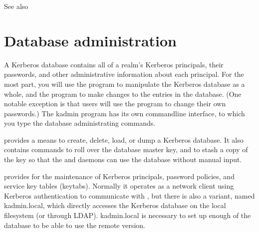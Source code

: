 \documentclass[letterpaper,10pt,english]{sphinxmanual}
\begin{document}
\sphinxAtStartPar
See also {\hyperref[\detokenize{admin/database:incr-db-prop}]{}}


\chapter{Database administration}
\label{\detokenize{admin/database:database-administration}}\label{\detokenize{admin/database::doc}}
\sphinxAtStartPar
A Kerberos database contains all of a realm’s Kerberos principals,
their passwords, and other administrative information about each
principal.  For the most part, you will use the {\hyperref[\detokenize{admin/admin_commands/kdb5_util:kdb5-util-8}]{}}
program to manipulate the Kerberos database as a whole, and the
{\hyperref[\detokenize{admin/admin_commands/kadmin_local:kadmin-1}]{}} program to make changes to the entries in the
database.  (One notable exception is that users will use the
 program to change their own passwords.)  The kadmin
program has its own command\sphinxhyphen{}line interface, to which you type the
database administrating commands.

\sphinxAtStartPar
{\hyperref[\detokenize{admin/admin_commands/kdb5_util:kdb5-util-8}]{}} provides a means to create, delete, load, or dump
a Kerberos database.  It also contains commands to roll over the
database master key, and to stash a copy of the key so that the
{\hyperref[\detokenize{admin/admin_commands/kadmind:kadmind-8}]{}} and {\hyperref[\detokenize{admin/admin_commands/krb5kdc:krb5kdc-8}]{}} daemons can use the database
without manual input.

\sphinxAtStartPar
{\hyperref[\detokenize{admin/admin_commands/kadmin_local:kadmin-1}]{}} provides for the maintenance of Kerberos principals,
password policies, and service key tables (keytabs).  Normally it
operates as a network client using Kerberos authentication to
communicate with {\hyperref[\detokenize{admin/admin_commands/kadmind:kadmind-8}]{}}, but there is also a variant, named
kadmin.local, which directly accesses the Kerberos database on the
local filesystem (or through LDAP).  kadmin.local is necessary to set
up enough of the database to be able to use the remote version.
\end{document}
